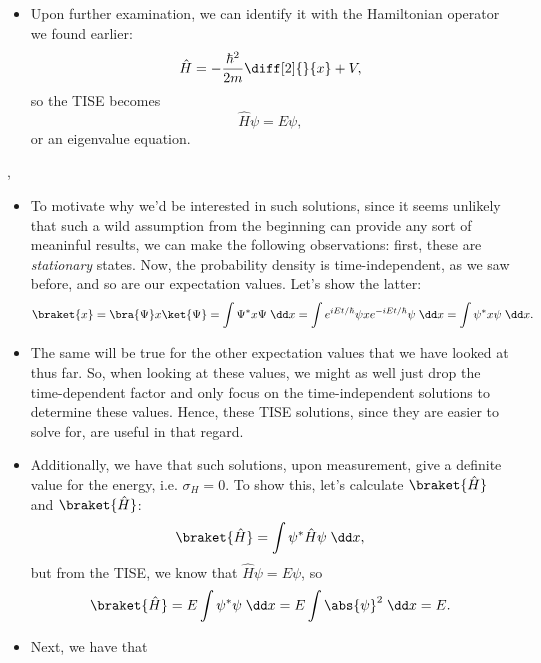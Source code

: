 \begin{itemize}
    \item Upon further examination, we can identify it with the Hamiltonian operator we found earlier:
        \begin{equation}
            \hat{H} = -\frac{\hbar^2}{2m} \diff[2]{}{x} + V,
        \end{equation}
        so the TISE becomes
        \begin{equation}
            \hat{H}\psi = E\psi,
        \end{equation}
        or an eigenvalue equation.
\end{itemize}

\sep

\begin{itemize}
    \item To motivate why we'd be interested in such solutions, since it seems unlikely that such a wild assumption from the beginning can provide any sort of meaninful results, we can make the following observations: first, these are \textit{stationary} states. Now, the probability density is time-independent, as we saw before, and so are our expectation values. Let's show the latter:
        \begin{equation}
            \braket{x} = \bra{\Psi}x\ket{\Psi} = \int\Psi^* x \Psi \;\dd x = \int e^{iEt/\hbar}\psi x e^{-iEt/\hbar}\psi \;\dd x = \int \psi^* x \psi \;\dd x.
        \end{equation}
    \item The same will be true for the other expectation values that we have looked at thus far. So, when looking at these values, we might as well just drop the time-dependent factor and only focus on the time-independent solutions to determine these values. Hence, these TISE solutions, since they are easier to solve for, are useful in that regard.
    \item Additionally, we have that such solutions, upon measurement, give a definite value for the energy, i.e. $\sigma_H = 0$. To show this, let's calculate $\braket{\hat{H}}$ and $\braket{\hat{H}}$:
        \begin{equation}
            \braket{\hat{H}} = \int \psi^* \hat{H} \psi \;\dd x,
        \end{equation}
        but from the TISE, we know that $\hat{H}\psi = E\psi$, so
        \begin{equation}
            \braket{\hat{H}} = E\int \psi^*\psi \;\dd x = E\int \abs{\psi}^2 \;\dd x = E.
        \end{equation}
    \item Next, we have that

\end{itemize}
